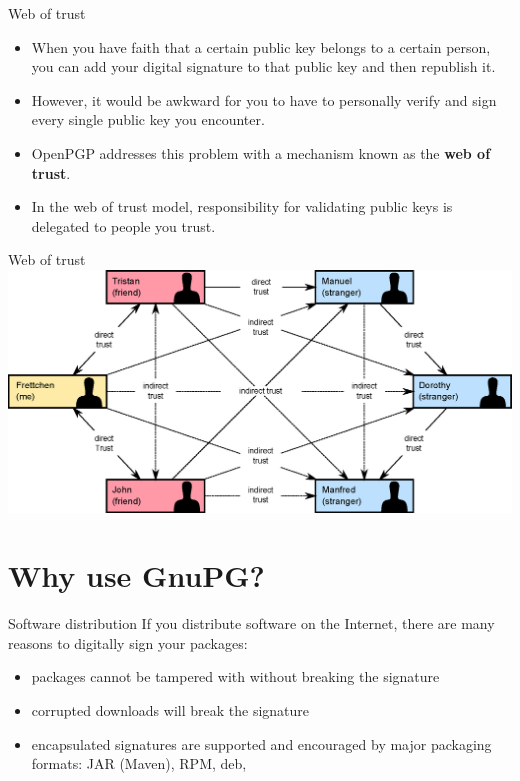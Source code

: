 \documentclass[
mode=present,
paper=smartboard,
size=20pt,
]{powerdot}
\begin{document}
\begin{slide}{Web of trust}
  \begin{itemize}
  \item When you have faith that a certain public key belongs to a
    certain person, you can add your digital signature to that public
    key and then republish it.
  \item However, it would be awkward for you to have to personally
    verify and sign every single public key you encounter.
  \item OpenPGP addresses this problem with a mechanism
    known as the \textbf{web of trust}.
  \item In the web of trust model, responsibility for validating
    public keys is delegated to people you trust.
  \end{itemize}
\end{slide}

\begin{slide}[toc=]{Web of trust}
\centering\includegraphics[width=\linewidth]{images/Web_of_Trust.eps}
\end{slide}


\section{Why use GnuPG?}
\begin{slide}{Software distribution}
  If you distribute software on the Internet, there are many reasons
  to digitally sign your packages:\\[1ex]
  \begin{itemize}
  \item packages cannot be tampered with without breaking the signature
  \item corrupted downloads will break the signature
  \item encapsulated signatures are supported and encouraged by major packaging formats: JAR (Maven), RPM, deb, \etc
  \end{itemize}
\end{slide}
\end{document}
